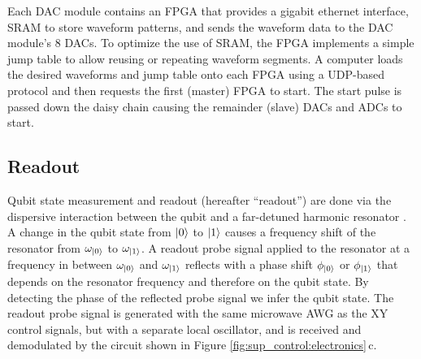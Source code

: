 Each DAC module contains an FPGA that provides a gigabit ethernet interface, SRAM to store waveform patterns, and sends the waveform data to the DAC module's 8 DACs.
To optimize the use of SRAM, the FPGA implements a simple jump table to allow reusing or repeating waveform segments.
A computer loads the desired waveforms and jump table onto each FPGA using a UDP-based protocol and then requests the first (master) FPGA to start.
The start pulse is passed down the daisy chain causing the remainder (slave) DACs and ADCs to start.




\subsection{Readout}

Qubit state measurement and readout (hereafter ``readout'') are done via the dispersive interaction between the qubit and a far-detuned harmonic resonator \cite{Blais2004CircuitQED, Gambetta2006, bultink2018general}.
A change in the qubit state from $\mathinner{|{0}\rangle}$ to $\mathinner{|{1}\rangle}$ causes a frequency shift of the resonator from $\omega_{\mathinner{|{0}\rangle}}$ to $\omega_{\mathinner{|{1}\rangle}}$.
A readout probe signal applied to the resonator at a frequency in between $\omega_{\mathinner{|{0}\rangle}}$ and $\omega_{\mathinner{|{1}\rangle}}$ reflects with a phase shift $\phi_{\mathinner{|{0}\rangle}}$ or $\phi_{\mathinner{|{1}\rangle}}$ that depends on the resonator frequency and therefore on the qubit state.
By detecting the phase of the reflected probe signal we infer the qubit state.
The readout probe signal is generated with the same microwave AWG as the XY control signals, but with a separate local oscillator, and is received and demodulated by the circuit shown in Figure \ref{fig:sup_control:electronics}\,c.

